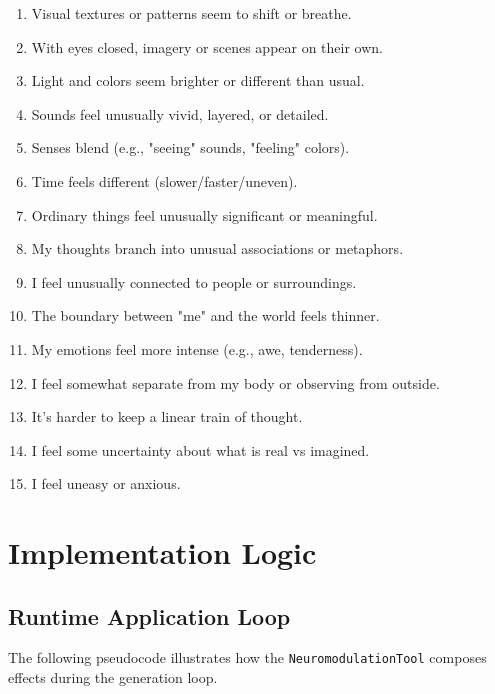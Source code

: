 \documentclass[10pt, twocolumn]{article}
\begin{document}
\begin{enumerate}
    \item Visual textures or patterns seem to shift or breathe.
    \item With eyes closed, imagery or scenes appear on their own.
    \item Light and colors seem brighter or different than usual.
    \item Sounds feel unusually vivid, layered, or detailed.
    \item Senses blend (e.g., "seeing" sounds, "feeling" colors).
    \item Time feels different (slower/faster/uneven).
    \item Ordinary things feel unusually significant or meaningful.
    \item My thoughts branch into unusual associations or metaphors.
    \item I feel unusually connected to people or surroundings.
    \item The boundary between "me" and the world feels thinner.
    \item My emotions feel more intense (e.g., awe, tenderness).
    \item I feel somewhat separate from my body or observing from outside.
    \item It's harder to keep a linear train of thought.
    \item I feel some uncertainty about what is real vs imagined.
    \item I feel uneasy or anxious.
\end{enumerate}

\section{Implementation Logic}
\label{app:impl}

\subsection{Runtime Application Loop}
The following pseudocode illustrates how the \texttt{NeuromodulationTool} composes effects during the generation loop.
\end{document}
